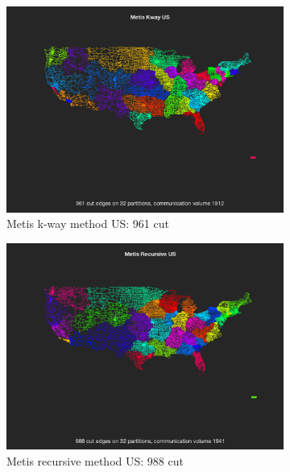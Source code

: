 \documentclass[unicode,11pt,a4paper,oneside,numbers=endperiod,openany]{scrartcl}
\begin{document}
\begin{figure}[h!]
\begin{subfigure}[b]{0.45\textwidth}
	\includegraphics[width=\textwidth]{images/metis_kway_us.png}
	\caption{Metis k-way method US: 961 cut}
	\end{subfigure}
	\hfill
	\begin{subfigure}[b]{0.45\textwidth}
	\includegraphics[width=\textwidth]{images/metis_rec_us.png}
	\caption{Metis recursive method US: 988 cut}
	\end{subfigure}
	\vfill
	\begin{subfigure}[b]{0.45\textwidth}

\end{subfigure}
\end{figure}
\end{document}
